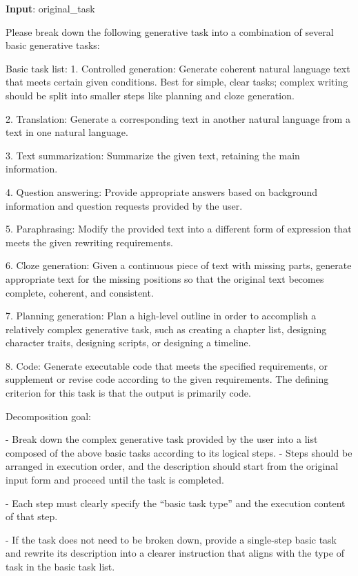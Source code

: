 \begin{tcolorbox}[title = {Task\_Decomposition\_Prompt}, breakable, colframe=blue!50!black, colback=blue!10]
\textbf{Input}: original\_task
\tcblower

Please break down the following generative task into a combination of several basic generative tasks:  

Basic task list:
1. Controlled generation: Generate coherent natural language text that meets certain given conditions. Best for simple, clear tasks; complex writing should be split into smaller steps like planning and cloze generation.

2. Translation: Generate a corresponding text in another natural language from a text in one natural language.  

3. Text summarization: Summarize the given text, retaining the main information.  

4. Question answering: Provide appropriate answers based on background information and question requests provided by the user.  

5. Paraphrasing: Modify the provided text into a different form of expression that meets the given rewriting requirements.  

6. Cloze generation: Given a continuous piece of text with missing parts, generate appropriate text for the missing positions so that the original text becomes complete, coherent, and consistent.  

7. Planning generation: Plan a high-level outline in order to accomplish a relatively complex generative task, such as creating a chapter list, designing character traits, designing scripts, or designing a timeline.  

8. Code: Generate executable code that meets the specified requirements, or supplement or revise code according to the given requirements. The defining criterion for this task is that the output is primarily code.


Decomposition goal:


- Break down the complex generative task provided by the user into a list composed of the above basic tasks according to its logical steps.  
- Steps should be arranged in execution order, and the description should start from the original input form and proceed until the task is completed.  

- Each step must clearly specify the “basic task type” and the execution content of that step.  

- If the task does not need to be broken down, provide a single-step basic task and rewrite its description into a clearer instruction that aligns with the type of task in the basic task list.



\end{tcolorbox}
